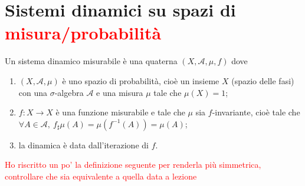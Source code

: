 %
%

\section{Sistemi dinamici su spazi di \textcolor{red}{misura/probabilità}}
\begin{definition}
    Un sistema dinamico misurabile è una quaterna $ (X, \mathcal{A}, \mu, f) $ dove
    \begin{enumerate}[label=(\roman*)]
        \item $ (X, \mathcal{A}, \mu) $ è uno spazio di probabilità, cioè un insieme $ X $ (spazio delle fasi) con una $ \sigma $-algebra $ \mathcal{A} $ e una misura $ \mu $ tale che $ \mu(X) = 1 $;
        \item $ f \colon X \to X $ è una funzione misurabile e tale che $ \mu $ sia $ f $-invariante, cioè tale che $ \forall A \in \mathcal{A}, \ f_{\sharp}\mu (A) = \mu(f^{-1}(A)) = \mu(A) $;
        \item la dinamica è data dall'iterazione di $ f $.
    \end{enumerate}
\end{definition}

\textcolor{red}{Ho riscritto un po' la definizione seguente per renderla più simmetrica, controllare che sia equivalente a quella data a lezione}

